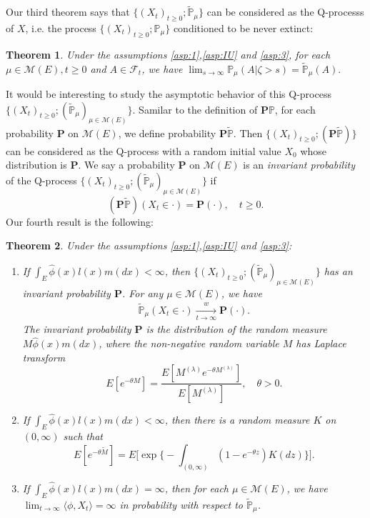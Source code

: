 \documentclass[12pt,a4paper]{amsart}
\numberwithin{equation}{section}
\theoremstyle{plain}
\newtheorem{thm}{Theorem}[section]
\theoremstyle{definition}
\begin{document}
Our third theorem says that $\{(X_t)_{t\geq 0}; \widetilde{\mathbb P}_{\mu}\}$ can be considered as the Q-processs of $X$, i.e. the process $\{(X_t)_{t\geq 0}; \mathbb P_{\mu}\}$ conditioned to be never extinct:
\begin{thm}\label{thm:Q_process}
	Under the assumptions \ref{asp:1},\ref{asp:IU} and \ref{asp:3}, for each  $\mu \in \mathcal M(E), t\geq 0$ and $A\in\mathscr F_t$, we have $\lim_{s\rightarrow\infty}\mathbb P_\mu(A |\zeta>s)=\widetilde{\mathbb P}_\mu(A). $
\end{thm}

It would be interesting to study the asymptotic behavior of this Q-process $\{(X_t)_{t\geq 0}; (\widetilde{\mathbb P}_\mu)_{\mu \in \mathcal M(E)}\}$.
Samilar to the definition of $\mathbf P\mathbb P$, for each probability $\mathbf
P$ on $\mathcal M(E)$, we define probability $\mathbf P\widetilde{\mathbb P}$.
Then $\{(X_t)_{t\geq 0}; (\mathbf P\widetilde{\mathbb P})\}$ can be considered as the Q-process with a random initial value $X_0$ whose distribution is $\mathbf P$.
We say a probability $\mathbf P$ on $\mathcal M(E)$ is an \emph{invariant probability} of the Q-process $\{(X_t)_{t\geq 0}; (\widetilde{\mathbb P}_\mu)_{\mu\in\mathcal M(E)}\}$ if
\[
	(\mathbf P\widetilde{\mathbb P})(X_t \in \cdot ) =\mathbf P(\cdot),	\quad t\geq 0.
\]
Our fourth result is the following:
\begin{thm}\label{thm:structure_of_Qprocess}
	Under the assumptions \ref{asp:1},\ref{asp:IU} and \ref{asp:3}:
  \begin{enumerate}
  \item
    If $\int_E\widehat\phi(x)l(x)m(dx)<\infty$, then $\{(X_t)_{t\geq 0};(\widetilde{\mathbb P}_\mu)_{\mu\in\mathcal M(E)}\}$ has an invariant probability ${\mathbf P}$.
    For any $\mu\in\mathcal M(E)$, we have
\begin{align}
\label{eq:uniqueness_of_invariant_probability}
\widetilde{\mathbb P}_\mu(X_t \in \cdot ) \xrightarrow[t\to \infty]{w} {\mathbf P}(\cdot).
\end{align}
    The invariant probability $\mathbf P$ is the distribution of the random measure $M\widehat\phi(x)m(dx)$, where the non-negative random variable $M$ has Laplace transform
    \[
      E[e^{-\theta  M}] = \dfrac{E[M^{(\lambda)}e^{-\theta M^{(\lambda)}}]}{E[M^{(\lambda)}]},\quad \theta > 0.
    \]
  \item
    If $\int_E\widehat\phi(x)l(x)m(dx)<\infty$, then there is a random measure $K$ on $(0,\infty)$ such that
    \[
      E[e^{-\theta \widetilde M}] = E\Big[\exp\Big\{- \int_{(0,\infty)} (1-e^{-\theta z }) K(dz) \Big\}\Big].
    \]
  \item
    If $\int_E\widehat\phi(x)l(x)m(dx)=\infty$, then for each $\mu \in \mathcal M(E)$, we have $\lim_{t\rightarrow\infty}\langle \phi, X_t\rangle =\infty$ in probability with respect to $\widetilde{\mathbb P}_\mu$.
  \end{enumerate}
\end{thm}
\end{document}
